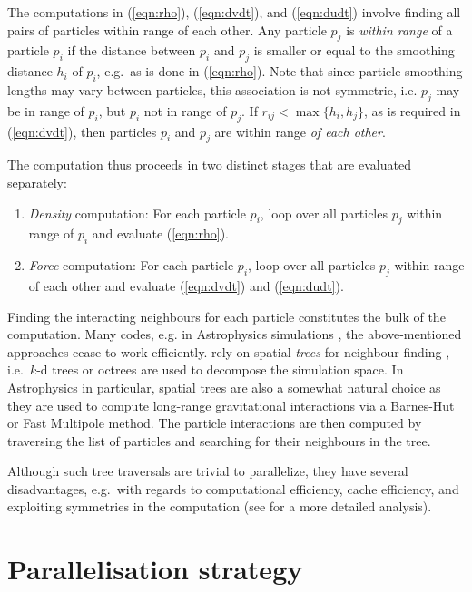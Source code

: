 \documentclass{sig-alternate-05-2015}
\newcommand{\eqn}[1] {(\ref{eqn:#1})}
\begin{document}
The computations in \eqn{rho}, \eqn{dvdt}, and \eqn{dudt} involve finding all
pairs of particles within range of each other.  Any particle $p_j$ is {\em
  within range} of a particle $p_i$ if the distance between $p_i$ and $p_j$ is
smaller or equal to the smoothing distance $h_i$ of $p_i$, e.g.~as is done in
\eqn{rho}.  Note that since particle smoothing lengths may vary between
particles, this association is not symmetric, i.e. $p_j$ may be in range of
$p_i$, but $p_i$ not in range of $p_j$.  If $r_{ij} < \max\{h_i,h_j\}$, as is
required in \eqn{dvdt}, then particles $p_i$ and $p_j$ are within range {\em of
each other}.

The computation thus proceeds in two distinct stages that are evaluated
separately:
\begin{enumerate}
    \item {\em Density} computation: For each particle $p_i$,
        loop over all particles $p_j$ within range of $p_i$ and evaluate
        \eqn{rho}.
    \item {\em Force} computation: For each particle $p_i$,
        loop over all particles $p_j$
        within range of each other and evaluate \eqn{dvdt} and \eqn{dudt}.
\end{enumerate}

Finding the interacting neighbours for each particle constitutes
the bulk of the computation.
Many codes, e.g. in Astrophysics simulations \cite{Gingold1977},
the above-mentioned approaches cease to work efficiently.
rely on spatial {\em trees}
for neighbour finding \cite{Gingold1977,Hernquist1989,Springel2005,Wadsley2004},
i.e.~$k$-d trees \cite{Bentley1975} or octrees \cite{Meagher1982}
are used to decompose the simulation space.
In Astrophysics in particular, spatial trees are also a somewhat natural
choice as they are used to compute long-range gravitational interactions
via a Barnes-Hut \cite{Barnes1986} or Fast Multipole
\cite{Carrier1988} method. 
The particle interactions are then computed by traversing the list of
particles and searching for their neighbours in the tree.

Although such tree traversals are trivial to parallelize, they
have several disadvantages, e.g.~with regards to computational
efficiency, cache efficiency, and exploiting symmetries in the
computation (see \cite{gonnet2015efficient} for a more detailed
analysis).



\section{Parallelisation strategy}
\end{document}
